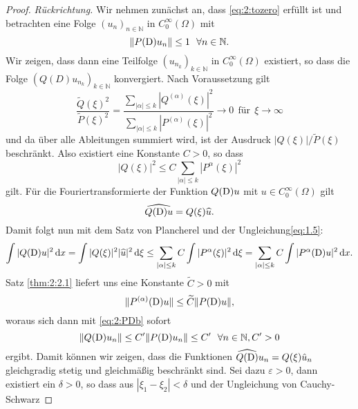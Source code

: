 \begin{proof} {\it Rückrichtung.}
Wir nehmen zunächst an, dass \eqref{eq:2:tozero} erfüllt ist und betrachten eine Folge ${(u_n)}_{n \in \mathbb{N}} $ in $C^\infty_0(\Omega)$ mit
\begin{equation}\label{eq:2:PDb}
\lVert P(\mathrm D)u_n\rVert\leq 1 \ \ \forall n \in \mathbb{N}.
\end{equation}
Wir zeigen, dass dann eine Teilfolge ${(u_{n_k})}_{k \in \mathbb{N}}$ in $C^\infty_0(\Omega)$ existiert,
so dass die Folge $\left(Q(D)u_{n_k}\right)_{k \in \mathbb{N}}$ konvergiert.
Nach Voraussetzung gilt 
\begin{equation}
\frac{\widetilde{Q}(\xi)^2}{\widetilde{P}(\xi)^2} = \frac{\sum_{|\alpha| \leq k} | Q^{(\alpha)} (\xi)|^2  }{ \sum_{|\alpha| \leq k} | P^{(\alpha)} (\xi)|^2} \rightarrow 0\ \ \text{für} \ \ \xi \rightarrow \infty
\end{equation}
und da über alle Ableitungen summiert wird, ist der Ausdruck $|Q(\xi)|/\widetilde{P}(\xi)$ beschränkt. Also existiert eine Konstante $C>0$, so dass
\begin{equation}
|Q(\xi)|^2 \leq C \sum_{|\alpha| \leq k} | P^{\alpha} (\xi)|^2 \label{eq:1.5}
\end{equation}
gilt. Für die Fouriertransformierte der Funktion $Q(\mathrm D)u$ mit $u \in C^\infty_0(\Omega)$ gilt 
\begin{equation}
\widehat{Q(\mathrm D)u} = Q(\xi) \widehat{u}.
\end{equation}
Damit folgt nun mit dem Satz von Plancherel und der Ungleichung\eqref{eq:1.5}:
\begin{equation}
\int |Q(\mathrm D)u|^2 \,\mathrm d x = \int |Q(\xi)|^2 |\widehat{u}|^2 \,\mathrm d \xi \leq  \sum_{|\alpha| \leq k}C\int | P^{\alpha} (\xi)|^2 \,\mathrm d \xi =\sum_{|\alpha| \leq k} C\int |P^{\alpha}(\mathrm D)u|^2 \,\mathrm d x.
\end{equation}
Satz \ref{thm:2:2.1} liefert uns eine Konstante $\widetilde{C}>0$ mit
\begin{equation}
\Vert P^{(\alpha)}(\mathrm D)u \Vert \leq \widetilde{C} \Vert P(\mathrm D)u \Vert, \label{eq:ableitung leq PD}
\end{equation}
woraus sich dann mit \eqref{eq:2:PDb} sofort
\begin{equation}
\norm{Q(\D)u_n}\leq C' \norm{P(\D)u_n} \leq C' \ \ \forall n \in \mathbb{N}, C' >0
\end{equation}
ergibt. Damit können wir zeigen, dass die Funktionen $\widehat{Q(\mathrm D)}u_n = Q(\xi) \hat{u}_n$ gleichgradig stetig und gleichmäßig beschränkt sind. Sei dazu $\varepsilon>0$, dann existiert ein $\delta>0$, so dass aus $|\xi_1 - \xi_2| < \delta$ und der Ungleichung von Cauchy-Schwarz 

\end{proof}
